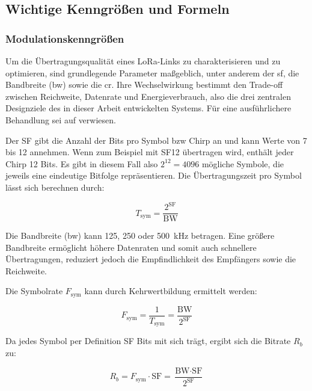 
\subsection{Wichtige Kenngrößen und Formeln} 
\label{subsec:param}

\subsubsection*{Modulationskenngrößen}

Um die Übertragungsqualität eines LoRa-Links zu charakterisieren und zu optimieren,
sind grundlegende Parameter maßgeblich, unter anderem der \acrfull{sf}, die Bandbreite
(\acrshort{bw}) sowie die \acrfull{cr}. Ihre Wechselwirkung bestimmt
den Trade-off zwischen Reichweite, Datenrate und Energieverbrauch, also die drei
zentralen Designziele des in dieser Arbeit entwickelten Systems. Für eine ausführlichere Behandlung sei auf \cite{montagnyLoRaLoRaWANInternet} 
verwiesen. 

Der SF gibt die Anzahl der Bits pro Symbol bzw Chirp an und kann Werte von 7 bis 12 annehmen. 
Wenn zum Beispiel mit SF12 übertragen wird, enthält jeder Chirp 12 Bits. Es gibt in diesem Fall also $2^{12} = 4096$ mögliche Symbole, 
die jeweils eine eindeutige Bitfolge repräsentieren. Die Übertragungszeit pro Symbol lässt sich berechnen durch:

\begin{equation}
  T_\text{sym} = \frac{2^\text{SF}}{\text{BW}}
  \label{eq:tsym}
\end{equation}

Die Bandbreite (\acrshort{bw}) kann 125, 250 oder \qty{500}{kHz} betragen. Eine größere Bandbreite ermöglicht höhere 
Datenraten und somit auch schnellere Übertragungen, reduziert jedoch die Empfindlichkeit des Empfängers sowie die Reichweite.

Die Symbolrate $F_{\text{sym}}$ kann durch Kehrwertbildung ermittelt werden:

\begin{equation}
  F_{\text{sym}} = \frac{1}{T_\text{sym}} = \frac{\text{BW}}{2^\text{SF}}
  \label{eq:fsym}
\end{equation}

Da jedes Symbol per Definition SF Bits mit sich trägt, ergibt sich die Bitrate $R_b$ zu:

\begin{equation}
  R_b = F_{\text{sym}} \cdot \text{SF} = \frac{\text{BW} \cdot \text{SF}}{2^\text{SF}}
  \label{eq:rb}
\end{equation}

